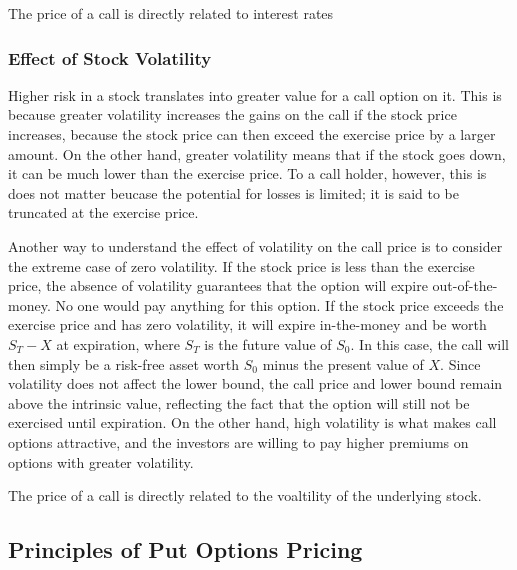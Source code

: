 \documentclass{book}
\theoremstyle{definition}
\theoremstyle{remark}
\begin{document}
        \begin{tcolorbox}[colback=blue!5!white,colframe=blue!75!black, title=Sticky Note]
            The price of a call is directly related to interest rates
        \end{tcolorbox}   

        \subsubsection{Effect of Stock Volatility}
            Higher risk in a stock translates into greater value for a call option on it. This is because greater volatility increases the gains on the call if the stock price increases, because the stock price can then exceed the exercise price by a larger amount. On the other hand,  greater volatility means that if the stock goes down, it can be much lower than the exercise price. To a call holder, however, this is does not matter beucase the potential for losses is limited; it is said to be truncated at the exercise price. 
            
            Another way to understand the effect of volatility on the call price is to consider the extreme case of zero volatility. If the stock price is less than the exercise price, the absence of volatility guarantees that the option will expire out-of-the-money. No one would pay anything for this option. If the stock price exceeds the exercise price and has zero volatility, it will expire in-the-money and be worth $S_T - X$ at expiration, where $S_T$ is the future value of $S_0$. In this case, the call will then simply be a risk-free asset worth $S_0$ minus the present value of $X$. Since volatility does not affect the lower bound, the call price and lower bound remain above the intrinsic value, reflecting the fact that the option will still not be exercised until expiration. On the other hand, high volatility is what makes call options attractive, and the investors are willing to pay higher premiums on options with greater volatility. 
            
        \begin{tcolorbox}[colback=blue!5!white,colframe=blue!75!black, title=Sticky Note]
            The price of a call is directly related to the voaltility of the underlying stock. 
        \end{tcolorbox}             
            
    \subsection{Principles of Put Options Pricing}
    
\end{document}

